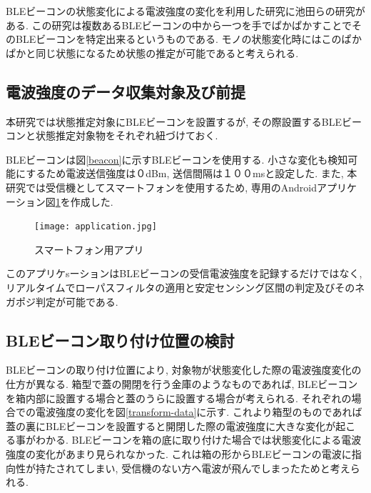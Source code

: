 \documentclass[Japanese]{dicomopapers}
\begin{document}
BLEビーコンの状態変化による電波強度の変化を利用した研究に池田ら\cite{BLEpkpk}の研究がある.
この研究は複数あるBLEビーコンの中から一つを手でぱかぱかすことでそのBLEビーコンを特定出来るというものである.
モノの状態変化時にはこのぱかぱかと同じ状態になるため状態の推定が可能であると考えられる.





\subsection{電波強度のデータ収集対象及び前提}



本研究では状態推定対象にBLEビーコンを設置するが, その際設置するBLEビーコンと状態推定対象物をそれぞれ紐づけておく.

BLEビーコンは図\ref{beacon}に示すBLEビーコンを使用する.
小さな変化も検知可能にするため電波送信強度は０dBm, 送信間隔は１００msと設定した.
また, 本研究では受信機としてスマートフォンを使用するため, 専用のAndroidアプリケーション図\ref{phoneApp}を作成した.

\begin{figure}[ht]
    \centering
    \texttt{[image: application.jpg]}
    \caption{スマートフォン用アプリ}
    \label{phoneApp}
\end{figure}
このアプリケsーションはBLEビーコンの受信電波強度を記録するだけではなく, リアルタイムでローパスフィルタの適用と安定センシング区間の判定及びそのネガポジ判定が可能である.






\subsection{BLEビーコン取り付け位置の検討}
BLEビーコンの取り付け位置により, 対象物が状態変化した際の電波強度変化の仕方が異なる.
箱型で蓋の開閉を行う金庫のようなものであれば, BLEビーコンを箱内部に設置する場合と蓋のうらに設置する場合が考えられる.
それぞれの場合での電波強度の変化を図\ref{transform-data}に示す.
これより箱型のものであれば蓋の裏にBLEビーコンを設置すると開閉した際の電波強度に大きな変化が起こる事がわかる.
BLEビーコンを箱の底に取り付けた場合では状態変化による電波強度の変化があまり見られなかった.
これは箱の形からBLEビーコンの電波に指向性が持たされてしまい, 受信機のない方へ電波が飛んでしまったためと考えられる.
\end{document}
